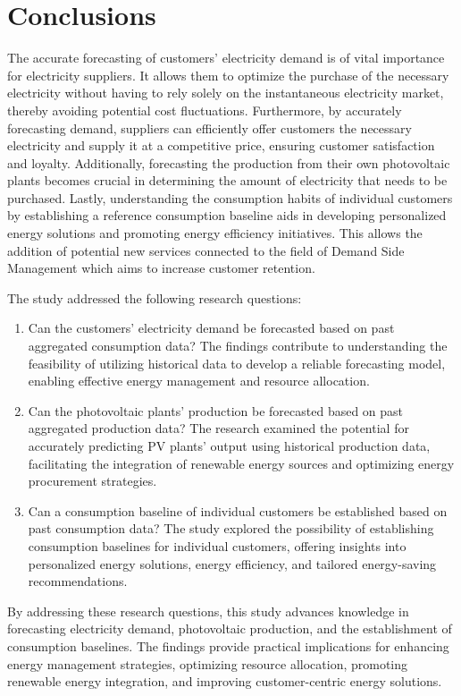\chapter{Conclusions}
\label{cha:conclusions}
\vspace{0.4 cm}

The accurate forecasting of customers’ electricity demand is of vital importance for electricity suppliers.
It allows them to optimize the purchase of the necessary electricity without having to rely solely on the instantaneous electricity market, thereby avoiding potential cost fluctuations.
Furthermore, by accurately forecasting demand, suppliers can efficiently offer customers the necessary electricity and supply it at a competitive price, ensuring customer satisfaction and loyalty.
Additionally, forecasting the production from their own photovoltaic plants becomes crucial in determining the amount of electricity that needs to be purchased.
Lastly, understanding the consumption habits of individual customers by establishing a reference consumption baseline aids in developing personalized energy solutions and promoting energy efficiency initiatives.
This allows the addition of potential new services connected to the field of Demand Side Management which aims to increase customer retention.

The study addressed the following research questions:
\begin{enumerate}
  \item Can the customers' electricity demand be forecasted based on past aggregated consumption data? The findings contribute to understanding the feasibility of utilizing historical data to develop a reliable forecasting model, enabling effective energy management and resource allocation.
  \item Can the photovoltaic plants' production be forecasted based on past aggregated production data? The research examined the potential for accurately predicting PV plants' output using historical production data, facilitating the integration of renewable energy sources and optimizing energy procurement strategies.
  \item Can a consumption baseline of individual customers be established based on past consumption data? The study explored the possibility of establishing consumption baselines for individual customers, offering insights into personalized energy solutions, energy efficiency, and tailored energy-saving recommendations.
\end{enumerate}
By addressing these research questions, this study advances knowledge in forecasting electricity demand, photovoltaic production, and the establishment of consumption baselines.
The findings provide practical implications for enhancing energy management strategies, optimizing resource allocation, promoting renewable energy integration, and improving customer-centric energy solutions.

